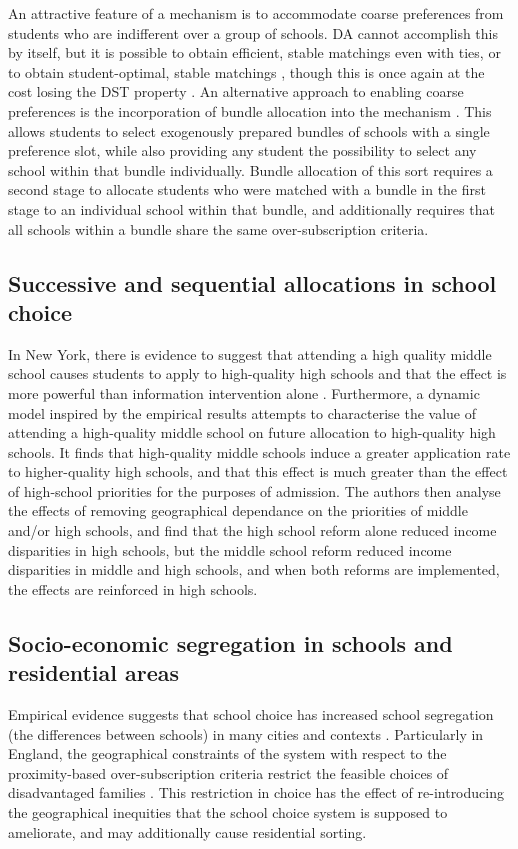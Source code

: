 \documentclass{article}
\begin{document}
\begin{multicols}{2}
An attractive feature of a mechanism is to accommodate coarse preferences from students who are indifferent over a group of schools. DA cannot accomplish this by itself, but it is possible to obtain efficient, stable matchings even with ties, or to obtain student-optimal, stable matchings \cite{erdilTwosidedMatchingIndifferences2017}, though this is once again at the cost losing the DST property \cite{rothEconomicsMatchingStability1982}. An alternative approach to enabling coarse preferences is the incorporation of bundle allocation into the mechanism \cite{huangBundledSchoolChoice2025}. This allows students to select exogenously prepared bundles of schools with a single preference slot, while also providing any student the possibility to select any school within that bundle individually. Bundle allocation of this sort requires a second stage to allocate students who were matched with a bundle in the first stage to an individual school within that bundle, and additionally requires that all schools within a bundle share the same over-subscription criteria.

\subsection{Successive and sequential allocations in school choice}
In New York, there is evidence to suggest that attending a high quality middle school causes students to apply to high-quality high schools and that the effect is more powerful than information intervention alone \cite{anderssonSequentialSchoolChoice2024}. Furthermore, a dynamic model inspired by the empirical results attempts to characterise the value of attending a high-quality middle school on future allocation to high-quality high schools. It finds that high-quality middle schools induce a greater application rate to higher-quality high schools, and that this effect is much greater than the effect of high-school priorities for the purposes of admission. The authors then analyse the effects of removing geographical dependance on the priorities of middle and/or high schools, and find that the high school reform alone reduced income disparities in high schools, but the middle school reform reduced income disparities in middle and high schools, and when both reforms are implemented, the effects are reinforced in high schools.

\subsection{Socio-economic segregation in schools and residential areas}
Empirical evidence suggests that school choice has increased school segregation (the differences between schools) in many cities and contexts \cite{wilsonSchoolChoiceCity2019}. Particularly in England, the geographical constraints of the system with respect to the proximity-based over-subscription criteria restrict the feasible choices of disadvantaged families \cite{burgessParentalChoicePrimary2011a,burgessSchoolChoiceEngland2019}. This restriction in choice has the effect of re-introducing the geographical inequities that the school choice system is supposed to ameliorate, and may additionally cause residential sorting. 


\end{multicols}
\end{document}
